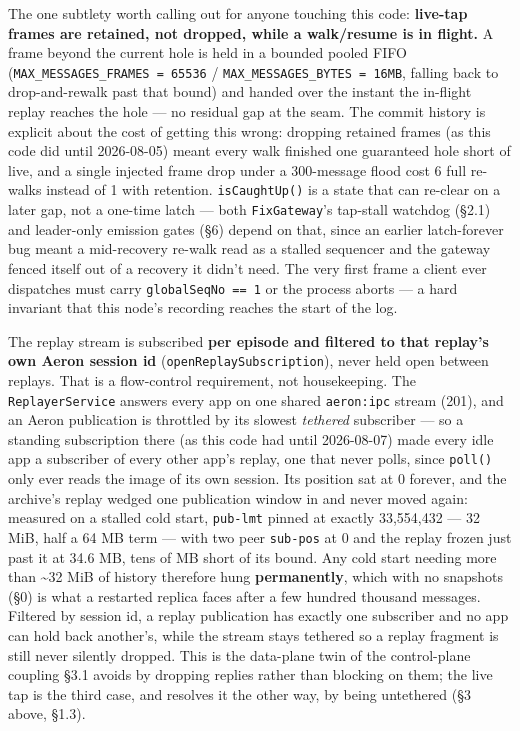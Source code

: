 \documentclass[
  10pt,
]{article}
\begin{document}
The one subtlety worth calling out for anyone touching this code:
\textbf{live-tap frames are retained, not dropped, while a walk/resume
is in flight.} A frame beyond the current hole is held in a bounded
pooled FIFO (\texttt{MAX\_MESSAGES\_FRAMES\ =\ 65536} /
\texttt{MAX\_MESSAGES\_BYTES\ =\ 16MB}, falling back to drop-and-rewalk
past that bound) and handed over the instant the in-flight replay
reaches the hole --- no residual gap at the seam. The commit history is
explicit about the cost of getting this wrong: dropping retained frames
(as this code did until 2026-08-05) meant every walk finished one
guaranteed hole short of live, and a single injected frame drop under a
300-message flood cost 6 full re-walks instead of 1 with retention.
\texttt{isCaughtUp()} is a state that can re-clear on a later gap, not a
one-time latch --- both \texttt{FixGateway}'s tap-stall watchdog (§2.1)
and leader-only emission gates (§6) depend on that, since an earlier
latch-forever bug meant a mid-recovery re-walk read as a stalled
sequencer and the gateway fenced itself out of a recovery it didn't
need. The very first frame a client ever dispatches must carry
\texttt{globalSeqNo\ ==\ 1} or the process aborts --- a hard invariant
that this node's recording reaches the start of the log.

The replay stream is subscribed \textbf{per episode and filtered to that
replay's own Aeron session id} (\texttt{openReplaySubscription}), never
held open between replays. That is a flow-control requirement, not
housekeeping. The \texttt{ReplayerService} answers every app on one
shared \texttt{aeron:ipc} stream (201), and an Aeron publication is
throttled by its slowest \emph{tethered} subscriber --- so a standing
subscription there (as this code had until 2026-08-07) made every idle
app a subscriber of every other app's replay, one that never polls,
since \texttt{poll()} only ever reads the image of its own session. Its
position sat at 0 forever, and the archive's replay wedged one
publication window in and never moved again: measured on a stalled cold
start, \texttt{pub-lmt} pinned at exactly 33,554,432 --- 32 MiB, half a
64 MB term --- with two peer \texttt{sub-pos} at 0 and the replay frozen
just past it at 34.6 MB, tens of MB short of its bound. Any cold start
needing more than \textasciitilde32 MiB of history therefore hung
\textbf{permanently}, which with no snapshots (§0) is what a restarted
replica faces after a few hundred thousand messages. Filtered by session
id, a replay publication has exactly one subscriber and no app can hold
back another's, while the stream stays tethered so a replay fragment is
still never silently dropped. This is the data-plane twin of the
control-plane coupling §3.1 avoids by dropping replies rather than
blocking on them; the live tap is the third case, and resolves it the
other way, by being untethered (§3 above, §1.3).
\end{document}
